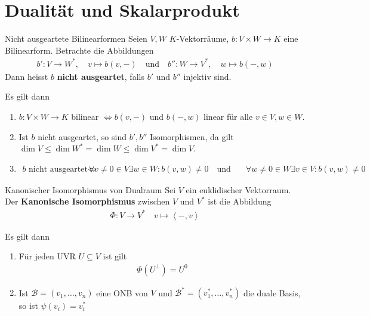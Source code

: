 
\section{Dualität und Skalarprodukt}

\begin{definition}{Nicht ausgeartete Bilinearformen}
    Seien $V,W$ $K$-Vektorräume, $b: V \times W \to K$ eine Bilinearform. Betrachte die Abbildungen
    \begin{align*}
        b': V \to W^*, \quad v \mapsto b(v,-) \quad \text{und} \quad b'': W \to V^*, \quad w \mapsto b(-,w)
    \end{align*}
    Dann heisst $b$ \textbf{nicht ausgeartet}, falls $b'$ und $b''$ injektiv sind.
\end{definition}
Es gilt dann 
\begin{enumerate}
    \item	$b: V \times W \to K$ bilinear $\Leftrightarrow b(v,-)$ und $b(-,w)$ linear für alle $v \in V, w \in W$.
    \item   Ist $b$ nicht ausgeartet, so sind $b', b''$ Isomorphismen, da gilt $\dim V \leq \dim W^* = \dim W \leq \dim V^* = \dim V$. 
    \item   
    \begin{align*}
        b \text{ nicht ausgeartet } \Leftrightarrow &\forall v \neq 0 \in V \exists w \in W: b(v,w) \neq 0 \quad \text{und} \quad
        &\forall w \neq 0 \in W \exists v \in V: b(v,w) \neq 0    
    \end{align*}
\end{enumerate}


\begin{definition}{Kanonischer Isomorphismus von Dualraum}
    Sei $V$ ein euklidischer Vektorraum. Der \textbf{Kanonische Isomorphismus} zwischen $V$ und $V^*$ ist die Abbildung
    \begin{align*}
        \Phi: V \to V^* \quad v \mapsto \left<-,v\right>
    \end{align*}
\end{definition}
Es gilt dann
\begin{enumerate}
    \item	Für jeden UVR $U \subseteq V$ ist gilt
    \begin{align*}
        \Phi(U^{\bot}) = U^{0}
    \end{align*}
    \item   Ist $\mathcal{B} = (v_{1}, \ldots, v_{n})$ eine ONB von $V$ und $\mathcal{B}^* = (v_{1}^*, \ldots, v_{n}^*)$ die duale Basis, so ist $\psi(v_i) = v_i^*$
\end{enumerate}

